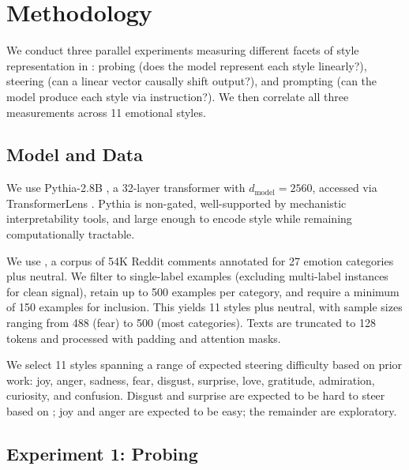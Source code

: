 \section{Methodology}
\label{sec:method}

We conduct three parallel experiments measuring different facets of style representation in \pythia: probing (does the model represent each style linearly?), steering (can a linear vector causally shift output?), and prompting (can the model produce each style via instruction?). We then correlate all three measurements across 11 emotional styles.

\subsection{Model and Data}

 We use Pythia-2.8B \citep{biderman2023pythia}, a 32-layer transformer with $d_\text{model} = 2560$, accessed via TransformerLens \citep{nanda2022transformerlens}. Pythia is non-gated, well-supported by mechanistic interpretability tools, and large enough to encode style while remaining computationally tractable.

 We use \goemotions \citep{demszky2020goemotions}, a corpus of 54K Reddit comments annotated for 27 emotion categories plus neutral. We filter to single-label examples (excluding multi-label instances for clean signal), retain up to 500 examples per category, and require a minimum of 150 examples for inclusion. This yields 11 styles plus neutral, with sample sizes ranging from 488 (fear) to 500 (most categories). Texts are truncated to 128 tokens and processed with padding and attention masks.

 We select 11 styles spanning a range of expected steering difficulty based on prior work: joy, anger, sadness, fear, disgust, surprise, love, gratitude, admiration, curiosity, and confusion. Disgust and surprise are expected to be hard to steer based on \citet{konen2024style}; joy and anger are expected to be easy; the remainder are exploratory.

\subsection{Experiment 1: Probing}
\label{sec:probing}

